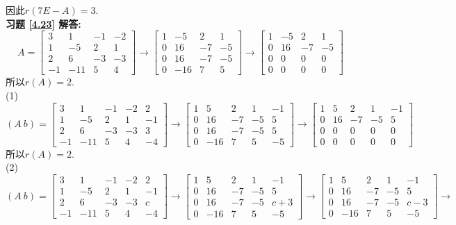 \documentclass[a4paper]{book}
\begin{document}
因此$r(7E-A)=3.$\\
\textbf{习题 \ref{4.23} 解答:}\\
$$A=\begin{bmatrix}3&1&-1&-2\\1&-5&2&1\\2&6&-3&-3\\-1&-11&5&4\end{bmatrix}\rightarrow\begin{bmatrix}1&-5&2&1\\ 0&16&-7&-5\\0&16&-7&-5\\0&-16&7&5\end{bmatrix}
\rightarrow\begin{bmatrix}1&-5&2&1\\ 0&16&-7&-5\\0&0&0&0\\0&0&0&0\end{bmatrix}$$
所以$r(A)=2$.\\
(1) $$(A\ b)=\begin{bmatrix}3&1&-1&-2&2\\1&-5&2&1&-1\\2&6&-3&-3&3\\-1&-11&5&4&-4\end{bmatrix}\rightarrow
\begin{bmatrix}1&5&2&1&-1\\0&16&-7&-5&5\\0&16&-7&-5&5\\0&-16&7&5&-5\end{bmatrix}\rightarrow
\begin{bmatrix}1&5&2&1&-1\\0&16&-7&-5&5\\0&0&0&0&0\\0&0&0&0&0\end{bmatrix} $$
所以$r(A)=2$.\\
(2) $$(A\ b)=\begin{bmatrix}3&1&-1&-2&2\\1&-5&2&1&-1\\2&6&-3&-3&c\\-1&-11&5&4&-4\end{bmatrix}\rightarrow
\begin{bmatrix}1&5&2&1&-1\\0&16&-7&-5&5\\0&16&-7&-5&c+3\\0&-16&7&5&-5\end{bmatrix}\rightarrow
\begin{bmatrix}1&5&2&1&-1\\0&16&-7&-5&5\\0&16&-7&-5&c-3\\0&-16&7&5&-5\end{bmatrix}\rightarrow$$
\end{document}
